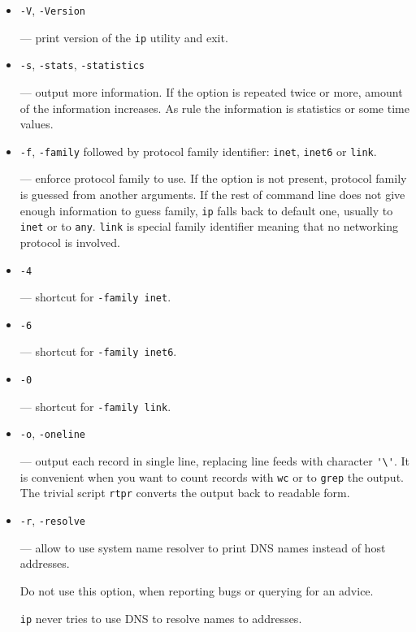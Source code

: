 \begin{itemize}
\item \verb|-V|, \verb|-Version|

--- print version of the \verb|ip| utility and exit.


\item \verb|-s|, \verb|-stats|, \verb|-statistics|

--- output more information. If the option
is repeated twice or more, amount of the information increases.
As rule the information is statistics or some time values.


\item \verb|-f|, \verb|-family| followed by protocol family
identifier: \verb|inet|, \verb|inet6| or \verb|link|.

--- enforce protocol family to use. If the option is not present,
protocol family is guessed from another arguments. If the rest  of command
line does not give enough information to guess family, \verb|ip| falls back to default
one, usually to \verb|inet| or to \verb|any|. \verb|link| is special family
identifier meaning that no networking protocol is involved.

\item \verb|-4|

--- shortcut for \verb|-family inet|.

\item \verb|-6|

--- shortcut for \verb|-family inet6|.

\item \verb|-0|

--- shortcut for \verb|-family link|.


\item \verb|-o|, \verb|-oneline|

--- output each record in single line, replacing line feeds
with character \verb|'\'|. It is convenient when you want to
count records with \verb|wc| or to \verb|grep| the output. The trivial
script \verb|rtpr| converts the output back to readable form.

\item \verb|-r|, \verb|-resolve|

--- allow to use system name resolver to print DNS names instead of
host addresses.

\begin{NB}
 Do not use this option, when reporting bugs or querying for an advice.
\end{NB}
\begin{NB}
 \verb|ip| never tries to use DNS to resolve names to addresses.
\end{NB}

\end{itemize}

